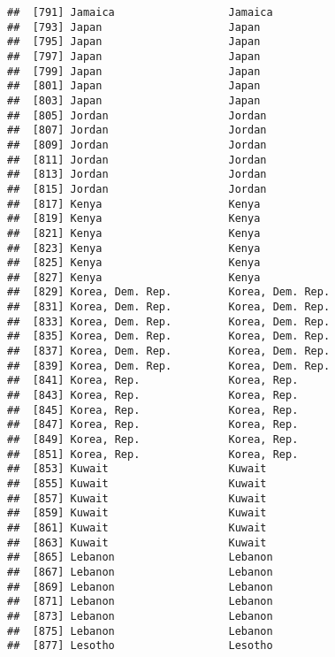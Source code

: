 \documentclass[]{article}
\begin{document}
\begin{verbatim}
##  [791] Jamaica                  Jamaica                 
##  [793] Japan                    Japan                   
##  [795] Japan                    Japan                   
##  [797] Japan                    Japan                   
##  [799] Japan                    Japan                   
##  [801] Japan                    Japan                   
##  [803] Japan                    Japan                   
##  [805] Jordan                   Jordan                  
##  [807] Jordan                   Jordan                  
##  [809] Jordan                   Jordan                  
##  [811] Jordan                   Jordan                  
##  [813] Jordan                   Jordan                  
##  [815] Jordan                   Jordan                  
##  [817] Kenya                    Kenya                   
##  [819] Kenya                    Kenya                   
##  [821] Kenya                    Kenya                   
##  [823] Kenya                    Kenya                   
##  [825] Kenya                    Kenya                   
##  [827] Kenya                    Kenya                   
##  [829] Korea, Dem. Rep.         Korea, Dem. Rep.        
##  [831] Korea, Dem. Rep.         Korea, Dem. Rep.        
##  [833] Korea, Dem. Rep.         Korea, Dem. Rep.        
##  [835] Korea, Dem. Rep.         Korea, Dem. Rep.        
##  [837] Korea, Dem. Rep.         Korea, Dem. Rep.        
##  [839] Korea, Dem. Rep.         Korea, Dem. Rep.        
##  [841] Korea, Rep.              Korea, Rep.             
##  [843] Korea, Rep.              Korea, Rep.             
##  [845] Korea, Rep.              Korea, Rep.             
##  [847] Korea, Rep.              Korea, Rep.             
##  [849] Korea, Rep.              Korea, Rep.             
##  [851] Korea, Rep.              Korea, Rep.             
##  [853] Kuwait                   Kuwait                  
##  [855] Kuwait                   Kuwait                  
##  [857] Kuwait                   Kuwait                  
##  [859] Kuwait                   Kuwait                  
##  [861] Kuwait                   Kuwait                  
##  [863] Kuwait                   Kuwait                  
##  [865] Lebanon                  Lebanon                 
##  [867] Lebanon                  Lebanon                 
##  [869] Lebanon                  Lebanon                 
##  [871] Lebanon                  Lebanon                 
##  [873] Lebanon                  Lebanon                 
##  [875] Lebanon                  Lebanon                 
##  [877] Lesotho                  Lesotho                 

\end{verbatim}
\end{document}

